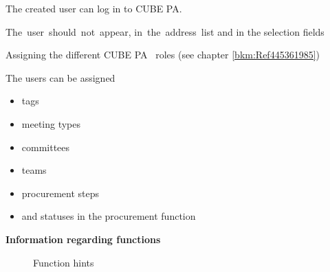 \begin{small}
\begin{raggedright}

The created user can log in to CUBE PA.

\vspace{\baselineskip}

\mbox{The user should not appear,} 
\mbox{in the address list}
and in the selection fields

\vspace{\baselineskip}

Assigning the different CUBE PA \
roles (see chapter \ref{bkm:Ref445361985})

\vspace{\baselineskip}
\vspace{\baselineskip}
\vspace{\baselineskip}

The users can be assigned

\vspace{\baselineskip}

\begin{itemize}
\item tags
\vspace{\baselineskip}
\vspace{\baselineskip}
\item meeting types
\vspace{\baselineskip}
\item committees
\item teams
\item procurement steps
\item and statuses in \newline the procurement function
\end{itemize}

\vspace{\baselineskip}



\end{raggedright}
\end{small}

\raggedright{}

\clearpage
\textbf{Information regarding functions}

\begin{figure}[H]
\caption{Function hints}
\end{figure}

